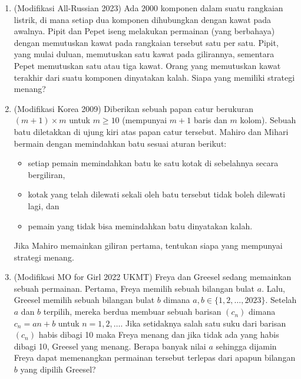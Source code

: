 \documentclass[12pt]{scrartcl}
\begin{document}
\begin{enumerate}[resume]
\item
(Modifikasi All-Russian 2023) Ada $2000$ komponen dalam suatu rangkaian listrik, di mana setiap dua komponen dihubungkan dengan kawat pada awalnya. Pipit dan Pepet iseng melakukan permainan (yang berbahaya) dengan memutuskan kawat pada rangkaian tersebut satu per satu. Pipit, yang mulai duluan, memutuskan satu kawat pada gilirannya, sementara Pepet memutuskan satu atau tiga kawat. Orang yang memutuskan kawat terakhir dari suatu komponen dinyatakan kalah. Siapa yang memiliki strategi menang?




\item
    (Modifikasi Korea 2009) Diberikan sebuah papan catur berukuran $(m+1) \times m$ untuk $m \ge 10$ (mempunyai $m+1$ baris dan $m$ kolom). Sebuah batu diletakkan di ujung kiri atas papan catur tersebut. Mahiro dan Mihari bermain dengan memindahkan batu sesuai aturan berikut:
    \begin{itemize}
        \item setiap pemain memindahkan batu ke satu kotak di sebelahnya secara bergiliran,
        \item kotak yang telah dilewati sekali oleh batu tersebut tidak boleh dilewati lagi, dan
        \item pemain yang tidak bisa memindahkan batu dinyatakan kalah.
    \end{itemize}
    Jika Mahiro memainkan giliran pertama, tentukan siapa yang mempunyai strategi menang.


\item
    (Modifikasi MO for Girl 2022 UKMT) Freya dan Greesel sedang memainkan sebuah permainan. Pertama, Freya memilih sebuah bilangan bulat $a$. Lalu, Greesel memilih sebuah bilangan bulat $b$ dimana $a,b \in \{1,2,\dots,2023\}$. Setelah $a$ dan $b$ terpilih, mereka berdua membuar sebuah barisan $(c_n)$ dimana $c_n = an + b$ untuk $n = 1,2,\dots$. Jika setidaknya salah satu suku dari barisan $(c_n)$ habis dibagi 10 maka Freya menang dan jika tidak ada yang habis dibagi 10, Greesel yang menang. Berapa banyak nilai $a$ sehingga dijamin Freya dapat memenangkan permainan tersebut terlepas dari apapun bilangan $b$ yang dipilih Greesel?



\end{enumerate}
\end{document}
